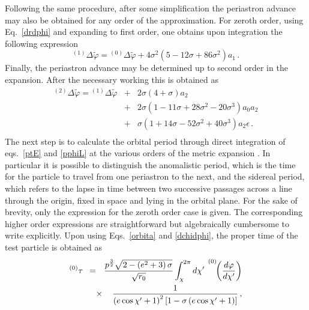 \documentclass[a4paper,aps,twocolumn,showpacs,showkeys,nofootinbib,preprintnumbers,superscriptaddress,amsmath,amssymb,amsfonts]{revtex4-1}
\begin{document}
Following the same procedure, after some simplification the periastron
advance may also be obtained for any order of the approximation. For
zeroth order, using Eq.~\eqref{drdphi} and expanding to first order, one
obtains upon integration the following expression
%
\begin{equation} \label{Prec1} 
  {}^{(1)}\Delta\widetilde{\varphi}= {}^{(0)}\Delta\widetilde{\varphi} + 
  4 \sigma^{2}\left(5-12\sigma+86\sigma^2\right) a_{1} \,.
\end{equation} 
%
Finally, the periastron advance may
be determined up to second order in the expansion. After the necessary
working this is obtained as
%
\begin{eqnarray} 
\label{Prec2}
{}^{(2)}\Delta\widetilde{\varphi} = {}^{(1)}\Delta\widetilde{\varphi}
&+& 2 \sigma \left(4 + \sigma \right) a_{2} \nonumber \\ 
&+& 2 \sigma \left(1 - 11\sigma + 28\sigma^2 - 20\sigma^3 \right) a_{0} a_{2} \nonumber \\
&+&   \sigma \left(1 + 14\sigma - 52\sigma^2 + 40\sigma^3 \right)a_{2} \epsilon \,. \nonumber \\
\end{eqnarray} 
The next step is to calculate the orbital period through
direct integration of eqs.~\eqref{ptE} and \eqref{pphiL} at the various
orders of the metric expansion \cite{Chandrasekhar83,Roy2005}.
In particular it is possible to distinguish the {anomalistic
period}, which is the time for the particle to travel from one
periastron to the next, and the {sidereal period}, which refers to the
lapse in time between two successive passages across a line through the
origin, fixed in space and lying in the orbital plane. For the sake of
brevity, only the expression for the zeroth order case is
given. 
The corresponding higher order expressions are
straightforward but algebraically cumbersome to write explicitly. Upon
using Eqs.~\eqref{orbita} and \eqref{dchidphi}, the proper time
of the test particle is obtained as
%
\begin{eqnarray} 
\label{tau}
{}^{(0)}\tau \ \ \!  = && \!\!\!\!\! \frac{p^{\frac{3}{2}}
  \sqrt{2 - \left(e^2+3\right) \sigma}}{\sqrt{r_0}}\int^{2\pi}_{\chi} {d\chi'}
\ \hspace{-7.5mm}{\phantom{\left(\frac{1}{1}\right)}}^{(0)}\!\!
\left(\frac{d\varphi}{d\chi'}\right) \nonumber \\ 
&\times& 
\frac{1}{\left(e \cos \chi'+1\right)^2 \left[1 - \sigma \left(e \cos \chi' +1\right)
    \right]} \,, \nonumber \\
\end{eqnarray}
\end{document}
